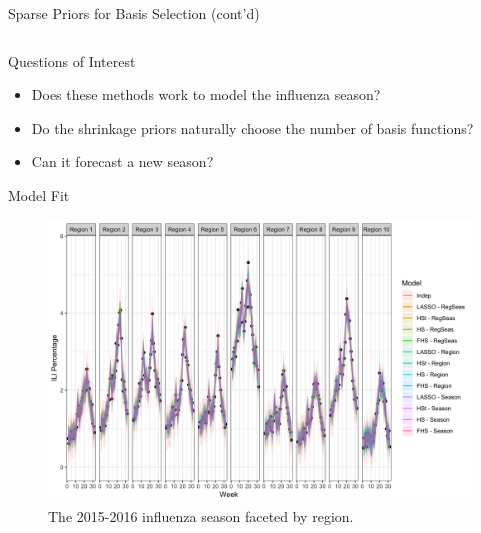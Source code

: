 \documentclass[final]{beamer}
\newlength{\onecolwid}
\newlength{\twocolwid}
\begin{document}
\begin{frame}[t]
\begin{columns}[t]
\begin{column}{\twocolwid}
\begin{columns}[t,totalwidth=\twocolwid]
\begin{column}{\onecolwid}
\begin{block}{Sparse Priors for Basis Selection (cont'd)}
\end{block}


\end{column} %

\end{columns} %


\begin{alertblock}{Questions of Interest}

\begin{itemize}
  \item Does these methods work to model the influenza season?
  \item Do the shrinkage priors naturally choose the number of basis functions?
  \item Can it forecast a new season?
\end{itemize}

\end{alertblock} 

\begin{block}{Model Fit}
\begin{figure}
\includegraphics[width=\linewidth]{plots/ILIfit.png}
\caption{The 2015-2016 influenza season faceted by region.}
\end{figure}
\end{block}


\end{column}
\end{columns}
\end{frame}
\end{document}
